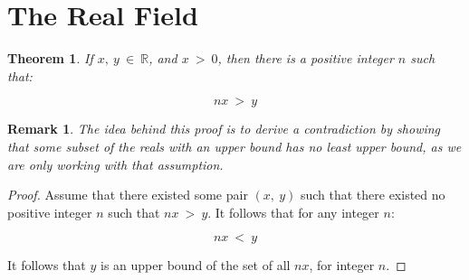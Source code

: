 \documentclass[10pt, oneside]{article}
\newtheorem{thm}{Theorem}
\newtheorem{rem}{Remark}
\begin{document}
\section{The Real Field}

\begin{thm}
	If $x, \ y \ \in \ \mathbb{R}$, and $x \ > \ 0$, then there is a positive integer 
	$n$ such that:

	$$nx \ > \ y$$
\end{thm}

\begin{rem}
	The idea behind this proof is to derive a contradiction by showing that some subset 
	of the reals with an upper bound has no least upper bound, as we are only working with 
	that assumption.
\end{rem}

\begin{proof}
	Assume that there existed some pair $(x, \ y)$ such that there existed no positive 
	integer $n$ such that $nx \ > \ y$. It follows that for any integer $n$:

	$$nx \ < \ y$$

	It follows that $y$ is an upper bound of the set of all $nx$, for integer $n$.  
\end{proof}
\end{document}
